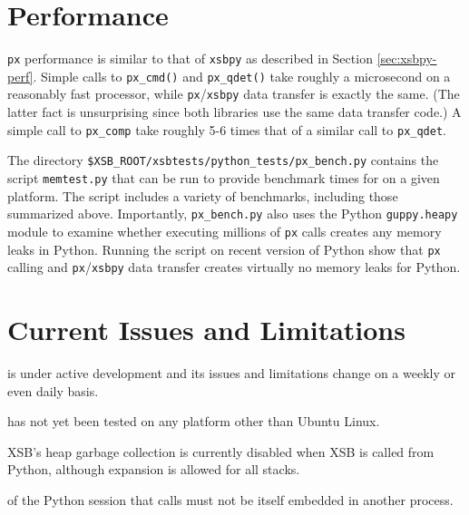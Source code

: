 \section{Performance} \label{sec:px-perf}

{\tt px} performance is similar to that of {\tt xsbpy} as described in
Section \ref{sec:xsbpy-perf}.  Simple calls to {\tt px\_cmd()} and
{\tt px\_qdet()} take roughly a microsecond on a reasonably fast
processor, while {\tt px}/{\tt xsbpy} data transfer is exactly the
same.  (The latter fact is unsurprising since both libraries use the
same data transfer code.)  A simple call to {\tt px\_comp} take
roughly 5-6 times that of a similar call to {\tt px\_qdet}.

The directory {\tt \$XSB\_ROOT/xsbtests/python\_tests/px\_bench.py}
contains the script {\tt memtest.py} that can be run to provide
benchmark times for on a given platform.  The script includes a
variety of benchmarks, including those summarized above.  Importantly,
{\tt px\_bench.py} also uses the Python {\tt guppy.heapy} module to
examine whether executing millions of {\tt px} calls creates any
memory leaks in Python.  Running the script on recent version of
Python show that {\tt px} calling and {\tt px}/{\tt xsbpy} data
transfer creates virtually no memory leaks for Python.

\section{Current Issues and Limitations} \label{sec:px-limits}

\px{} is under active development and its issues and limitations
change on a weekly or even daily basis.

\bi
\item \px{} has not yet been tested on any platform other than Ubuntu
  Linux.
\item XSB's heap garbage collection is currently disabled when XSB is
  called from Python, although expansion is allowed for all stacks.
\item \pxversion{} of \px{} the Python session that calls \px{} must
  not be itself embedded in another process.
\ei  
  
 
